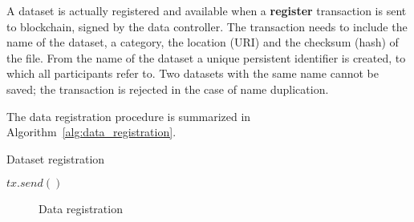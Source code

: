A dataset is actually registered and available when a \textbf{register} transaction is sent to blockchain, signed by the data controller. The transaction needs to include the name of the dataset, a category, the location (URI) and the checksum (hash) of the file. From the name of the dataset a unique persistent identifier is created, to which all participants refer to. Two datasets with the same name cannot be saved; the transaction is rejected in the case of name duplication.

The data registration procedure is summarized in Algorithm~\ref{alg:data_registration}.

\begin{algorithm}[!htb]
  \caption{Dataset registration}\label{alg:data_registration}
  \begin{algorithmic}[1]
      \State {}
  \EndFunction
        \State $tx.send()$
        \State {}
  \EndFunction
    \State {}
  \EndProcedure
  \end{algorithmic}
\end{algorithm}

\begin{figure}[ht!]
  \caption{Data registration}
  \label{fig:arc:reg}
\end{figure}

